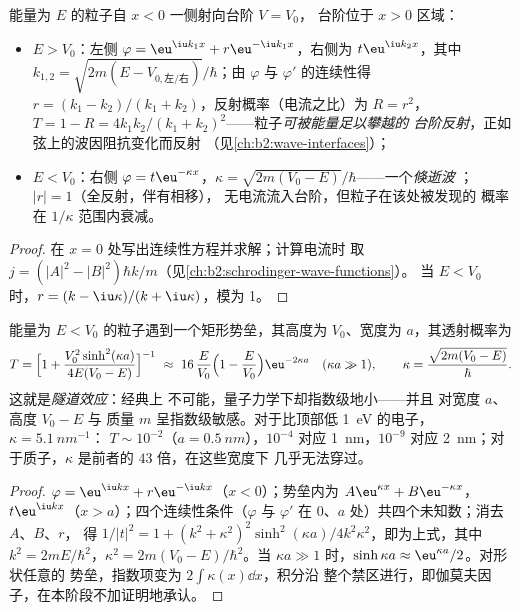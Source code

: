 \begin{proposition}[势阶]\label{prop:b2:potential-wells-tunneling:step}
能量为 $E$ 的粒子自 $x < 0$ 一侧射向台阶 $V = V_0$，
台阶位于 $x > 0$ 区域：
\begin{itemize}
\item $E > V_0$：左侧 $\varphi = \eu^{\iu k_1x} + r\eu^{-\iu k_1x}$，右侧为 $t\eu^{\iu
      k_2x}$，其中 $k_{1,2} = \sqrt{2m(E - V_{0,\text{左/右}})}/
      \hbar$；由 $\varphi$ 与 $\varphi'$ 的连续性得 $r = (k_1 - k_2)/(k_1
      + k_2)$，反射概率（电流之比）为 $R = r^2$，
      $T = 1 - R = 4k_1k_2/(k_1 + k_2)^2$——粒子\emph{可被能量足以攀越的
      台阶反射}，正如弦上的波因阻抗变化而反射
      （见\cref{ch:b2:wave-interfaces}）；
\item $E < V_0$：右侧 $\varphi = t\eu^{-\kappa x}$，$\kappa = \sqrt{2m(V_0
      - E)}/\hbar$——一个\emph{倏逝波}
；$|r| = 1$（全反射，伴有相移），
      无电流流入台阶，但粒子在该处被发现的
      概率在 $1/\kappa$ 范围内衰减。
\end{itemize}
\end{proposition}

\begin{proof}
在 $x = 0$ 处写出连续性方程并求解；计算电流时
取 $j = (|A|^2 - |B|^2)\hbar k/m$（见\cref{ch:b2:schrodinger-wave-functions}）。
当 $E < V_0$ 时，$r = (k - \iu\kappa)/(k + \iu\kappa)$，模为 1。
\end{proof}

\begin{theorem}[穿过势垒的隧道效应]\label{thm:b2:potential-wells-tunneling:tunnel}
能量为 $E < V_0$ 的粒子遇到一个矩形势垒，其高度为
$V_0$、宽度为 $a$，其透射概率为
\[
T = \Big[1 + \frac{V_0^2\sinh^2(\kappa a)}{4E(V_0 - E)}\Big]^{-1}
\ \approx\ 16\,\frac{E}{V_0}\Big(1 - \frac{E}{V_0}\Big)\eu^{-2\kappa a}
\quad (\kappa a \gg 1), \qquad
\kappa = \frac{\sqrt{2m(V_0 - E)}}{\hbar} .
\]
这就是\emph{隧道效应}：经典上
不可能，量子力学下却指数级地小——并且
对宽度 $a$、高度 $V_0 - E$ 与
质量 $m$ 呈指数级敏感。对于比顶部低 \qty{1}{eV} 的电子，$\kappa = \qty{5.1}{nm^{-1}}$：
$T \sim 10^{-2}$（$a = \qty{0.5}{nm}$），$10^{-4}$ 对应 \qty{1}{nm}，$10^{-9}$ 对应
\qty{2}{nm}；对于质子，$\kappa$ 是前者的 $43$ 倍，在这些宽度下
几乎无法穿过。
\end{theorem}

\begin{proof}
$\varphi = \eu^{\iu kx} + r\eu^{-\iu kx}$（$x < 0$）；势垒内为 $A\eu^{\kappa x} + B\eu^{-\kappa x}$，
$t\eu^{\iu kx}$（$x > a$）；四个连续性条件（$\varphi$ 与
$\varphi'$ 在 $0$、$a$ 处）共四个未知数；消去 $A$、$B$、$r$，
得 $1/|t|^2 = 1 + (k^2 + \kappa^2)^2\sinh^2(\kappa a)/4k^2\kappa^2$，即为上式，其中
$k^2 = 2mE/\hbar^2$，$\kappa^2 = 2m(V_0 - E)/\hbar^2$。当
$\kappa a \gg 1$ 时，$\sinh\kappa a \approx \eu^{\kappa a}/2$。对形状任意的
势垒，指数项变为 $2\int\kappa(x)\dd x$，积分沿
整个禁区进行，即伽莫夫因子，在本阶段不加证明地承认。
\end{proof}

